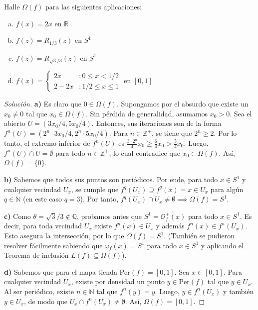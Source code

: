 \begin{ejercicio}
	Halle $\Omega(f)$ para las siguientes aplicaciones:
	\begin{enumerate}[a)]
		\item $f(x)=2x$ en $\mathbb{R}$
		\item $f(z)=R_{1/3}(z)$ en $S^1$
		\item $f(z)=R_{\sqrt{3}/3}(z)$ en $S^1$
		\item $f(x) = \begin{cases} 2x & : 0 \le x < 1/2 \\ 2-2x & : 1/2 \le x \le 1 \end{cases}$ en $[0,1]$
	\end{enumerate}
\end{ejercicio}
\begin{proof}[Solución]
	\textbf{a)} Es claro que $0 \in \Omega(f)$. Supongamos por el absurdo que existe un $x_0 \neq 0$ tal que $x_0 \in \Omega(f)$. Sin pérdida de generalidad, asumamos $x_0 > 0$. Sea el abierto $U = (3x_0/4, 5x_0/4)$.
	Entonces, sus iteraciones son de la forma $f^n(U) = (2^n \cdot 3x_0/4, 2^n \cdot 5x_0/4)$. Para $n \in \mathbb{Z}^+$, se tiene que $2^n \ge 2$. Por lo tanto, el extremo inferior de $f^n(U)$ es $\frac{3 \cdot 2^n}{4} x_0 \ge \frac{6}{4} x_0 > \frac{5}{4} x_0$. 
	Luego, $f^n(U) \cap U = \emptyset$ para todo $n \in \mathbb{Z}^+$, lo cual contradice que $x_0 \in \Omega(f)$. Así, $\Omega(f) = \{0\}$.
	
	\textbf{b)} Sabemos que todos sus puntos son periódicos. Por ende, para todo $x \in S^1$ y cualquier vecindad $U_x$, se cumple que $f^q(U_x) \supseteq f^q(x) = x \in U_x$ para algún $q \in \mathbb{N}$ (en este caso $q=3$). Por tanto, $f^q(U_x) \cap U_x \neq \emptyset \implies \Omega(f) = S^1$.
	
	\textbf{c)} Como $\theta = \sqrt{3}/3 \notin \mathbb{Q}$, probamos antes que $S^1 = \overline{\mathcal{O}_f^+(x)}$ para todo $x \in S^1$. Es decir, para toda vecindad $U_x$ existe $f^n(x) \in U_x$ y además $f^n(x) \in f^n(U_x)$. Esto asegura la intersección, por lo que $\Omega(f) = S^1$. (También se pudieron resolver fácilmente sabiendo que $\omega_f(x) = S^1$ para todo $x \in S^1$ y aplicando el Teorema de inclusión $L(f) \subseteq \Omega(f)$).
	
	\textbf{d)} Sabemos que para el mapa tienda $\overline{\text{Per}(f)} = [0,1]$. Sea $x \in [0,1]$. Para cualquier vecindad $U_x$, existe por densidad un punto $y \in \text{Per}(f)$ tal que $y \in U_x$. Al ser periódico, existe $n \in \mathbb{N}$ tal que $f^n(y) = y$.
	Luego, $y \in f^n(U_x)$ y también $y \in U_x$, de modo que $U_x \cap f^n(U_x) \neq \emptyset$. Así, $\Omega(f) = [0,1]$.
\end{proof}